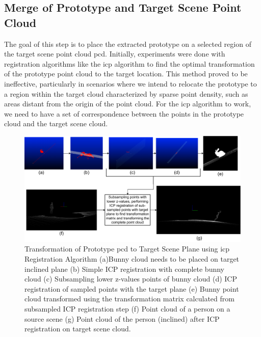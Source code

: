 \subsection{Merge of Prototype and Target Scene Point Cloud}
The goal of this step is to place the extracted prototype on a selected region of the target scene point cloud \acrshort{pcd}. Initially, experiments were done with registration algorithms like the \acrfull{icp} algorithm to find the optimal transformation of the prototype point cloud to the target location. This method proved to be ineffective, particularly in scenarios where we intend to relocate the prototype to a region within the target cloud characterized by sparse point density, such as areas distant from the origin of the point cloud. For the \acrshort{icp} algorithm to work, we need to have a set of correspondence between the points in the prototype cloud and the target scene cloud. 

\begin{figure}[htbp]
    \centering
    \includegraphics[width=1\linewidth]{97_graphics/concepts/icp_registration_analysis.pdf}
    \caption[Transformation of Prototype \acrshort{pcd} to Target Scene Plane using \acrshort{icp} Registration Algorithm.]{Transformation of Prototype \acrshort{pcd} to Target Scene Plane using \acrshort{icp} Registration Algorithm (a)Bunny cloud needs to be placed on target inclined plane (b) Simple ICP registration with complete bunny cloud (c) Subsampling lower z-values points of bunny cloud (d) ICP registration of sampled points with the target plane (e) Bunny point cloud transformed using the transformation matrix calculated from subsampled ICP registration step (f) Point cloud of a person on a source scene (g) Point cloud of the person (inclined) after ICP registration on target scene cloud.} 
    \label{fig:icp_registration_analaysis}
\end{figure}


